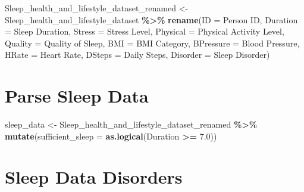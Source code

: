 \documentclass[
  11pt,
]{article}
\newenvironment{Shaded}{\begin{snugshade}}{\end{snugshade}}
\newcommand{\AttributeTok}[1]{\textcolor[rgb]{0.13,0.29,0.53}{#1}}
\newcommand{\FloatTok}[1]{\textcolor[rgb]{0.00,0.00,0.81}{#1}}
\newcommand{\FunctionTok}[1]{\textcolor[rgb]{0.13,0.29,0.53}{\textbf{#1}}}
\newcommand{\NormalTok}[1]{#1}
\newcommand{\OtherTok}[1]{\textcolor[rgb]{0.56,0.35,0.01}{#1}}
\newcommand{\SpecialCharTok}[1]{\textcolor[rgb]{0.81,0.36,0.00}{\textbf{#1}}}
\newcommand{\StringTok}[1]{\textcolor[rgb]{0.31,0.60,0.02}{#1}}
\begin{document}
\begin{Shaded}
\begin{Highlighting}[]
\NormalTok{Sleep\_health\_and\_lifestyle\_dataset\_renamed }\OtherTok{\textless{}{-}}\NormalTok{ Sleep\_health\_and\_lifestyle\_dataset }\SpecialCharTok{\%\textgreater{}\%}
  \FunctionTok{rename}\NormalTok{(}\AttributeTok{ID =} \StringTok{\textquotesingle{}Person ID\textquotesingle{}}\NormalTok{,}
         \AttributeTok{Duration =} \StringTok{\textquotesingle{}Sleep Duration\textquotesingle{}}\NormalTok{,}
         \AttributeTok{Stress =} \StringTok{\textquotesingle{}Stress Level\textquotesingle{}}\NormalTok{,}
         \AttributeTok{Physical =} \StringTok{\textquotesingle{}Physical Activity Level\textquotesingle{}}\NormalTok{,}
         \AttributeTok{Quality =} \StringTok{\textquotesingle{}Quality of Sleep\textquotesingle{}}\NormalTok{,}
         \AttributeTok{BMI =} \StringTok{\textquotesingle{}BMI Category\textquotesingle{}}\NormalTok{,}
         \AttributeTok{BPressure =} \StringTok{\textquotesingle{}Blood Pressure\textquotesingle{}}\NormalTok{,}
         \AttributeTok{HRate =} \StringTok{\textquotesingle{}Heart Rate\textquotesingle{}}\NormalTok{,}
         \AttributeTok{DSteps =} \StringTok{\textquotesingle{}Daily Steps\textquotesingle{}}\NormalTok{,}
         \AttributeTok{Disorder =} \StringTok{\textquotesingle{}Sleep Disorder\textquotesingle{}}\NormalTok{)}
\end{Highlighting}
\end{Shaded}

\hypertarget{parse-sleep-data}{%
\section{Parse Sleep Data}\label{parse-sleep-data}}

\begin{Shaded}
\begin{Highlighting}[]
\NormalTok{sleep\_data }\OtherTok{\textless{}{-}}\NormalTok{ Sleep\_health\_and\_lifestyle\_dataset\_renamed }\SpecialCharTok{\%\textgreater{}\%}
    \FunctionTok{mutate}\NormalTok{(}\AttributeTok{sufficient\_sleep =} \FunctionTok{as.logical}\NormalTok{(Duration }\SpecialCharTok{\textgreater{}=} \FloatTok{7.0}\NormalTok{))}
\end{Highlighting}
\end{Shaded}

\hypertarget{sleep-data-disorders}{%
\section{Sleep Data Disorders}\label{sleep-data-disorders}}
\end{document}

